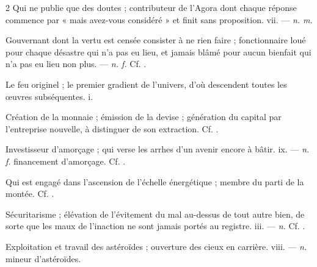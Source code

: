 \begin{multicols}{2}
 Qui ne publie que des doutes ; contributeur de l'Agora dont chaque réponse commence par « mais avez-vous considéré » et finit sans proposition.   vii. —  \textit{n. m.}

 Gouvernant dont la vertu est censée consister à ne rien faire ; fonctionnaire loué pour chaque désastre qui n'a pas eu lieu, et jamais blâmé pour aucun bienfait qui n'a pas eu lieu non plus. —  \textit{n. f.} Cf. .

 Le feu originel ; le premier gradient de l'univers, d'où descendent toutes les œuvres subséquentes.   i.

 Création de la monnaie ;  émission de la devise ;   génération du capital par l'entreprise nouvelle, à distinguer de son extraction. Cf. .

 Investisseur d'amorçage ; qui verse les arrhes d'un avenir encore à bâtir.   ix. —  \textit{n. f.} financement d'amorçage. Cf. .

 Qui est engagé dans l'ascension de l'échelle énergétique ; membre du parti de la montée.  Cf. .

 Sécuritarisme ; élévation de l'évitement du mal au-dessus de tout autre bien, de sorte que les maux de l'inaction ne sont jamais portés au registre.   iii. —  \textit{n.} Cf. .

 Exploitation et travail des astéroïdes ; ouverture des cieux en carrière.   viii. —  \textit{n.} mineur d'astéroïdes.


\end{multicols}
